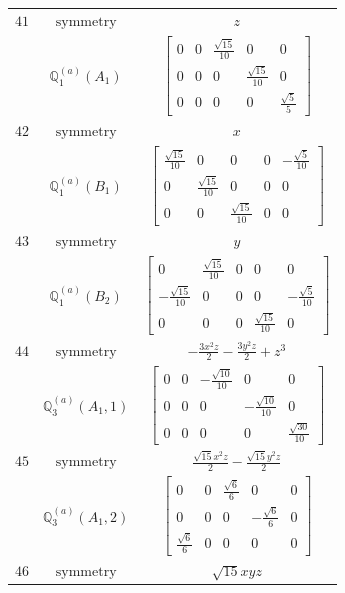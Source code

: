 \documentclass[fleqn,8pt,landscape]{jsarticle}
\begin{document}
\begin{longtable}{ccc}
$ 41 $ & $ \text{symmetry} $ & $ z $ \\
$  $ & $ \mathbb{Q}_{1}^{(a)}(A_{1}) $ & $ \begin{bmatrix} 0 & 0 & \frac{\sqrt{15}}{10} & 0 & 0 \\ 0 & 0 & 0 & \frac{\sqrt{15}}{10} & 0 \\ 0 & 0 & 0 & 0 & \frac{\sqrt{5}}{5} \end{bmatrix} $ \\ \hline
$ 42 $ & $ \text{symmetry} $ & $ x $ \\
$  $ & $ \mathbb{Q}_{1}^{(a)}(B_{1}) $ & $ \begin{bmatrix} \frac{\sqrt{15}}{10} & 0 & 0 & 0 & - \frac{\sqrt{5}}{10} \\ 0 & \frac{\sqrt{15}}{10} & 0 & 0 & 0 \\ 0 & 0 & \frac{\sqrt{15}}{10} & 0 & 0 \end{bmatrix} $ \\ \hline
$ 43 $ & $ \text{symmetry} $ & $ y $ \\
$  $ & $ \mathbb{Q}_{1}^{(a)}(B_{2}) $ & $ \begin{bmatrix} 0 & \frac{\sqrt{15}}{10} & 0 & 0 & 0 \\ - \frac{\sqrt{15}}{10} & 0 & 0 & 0 & - \frac{\sqrt{5}}{10} \\ 0 & 0 & 0 & \frac{\sqrt{15}}{10} & 0 \end{bmatrix} $ \\ \hline
$ 44 $ & $ \text{symmetry} $ & $ - \frac{3 x^{2} z}{2} - \frac{3 y^{2} z}{2} + z^{3} $ \\
$  $ & $ \mathbb{Q}_{3}^{(a)}(A_{1},1) $ & $ \begin{bmatrix} 0 & 0 & - \frac{\sqrt{10}}{10} & 0 & 0 \\ 0 & 0 & 0 & - \frac{\sqrt{10}}{10} & 0 \\ 0 & 0 & 0 & 0 & \frac{\sqrt{30}}{10} \end{bmatrix} $ \\ \hline
$ 45 $ & $ \text{symmetry} $ & $ \frac{\sqrt{15} x^{2} z}{2} - \frac{\sqrt{15} y^{2} z}{2} $ \\
$  $ & $ \mathbb{Q}_{3}^{(a)}(A_{1},2) $ & $ \begin{bmatrix} 0 & 0 & \frac{\sqrt{6}}{6} & 0 & 0 \\ 0 & 0 & 0 & - \frac{\sqrt{6}}{6} & 0 \\ \frac{\sqrt{6}}{6} & 0 & 0 & 0 & 0 \end{bmatrix} $ \\ \hline
$ 46 $ & $ \text{symmetry} $ & $ \sqrt{15} x y z $ \\

\end{longtable}
\end{document}
